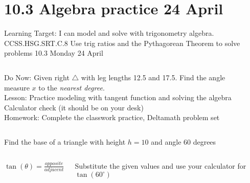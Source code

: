 \documentclass[onlytextwidth, aspectratio=169]{beamer}
\begin{document}
\section{10.3 Algebra practice \hfill 24 April \,}
\begin{frame}{Learning Target: I can model and solve with trigonometry algebra.}
  {CCSS.HSG.SRT.C.8 Use trig ratios and the Pythagorean Theorem to solve problems \hfill \alert{10.3 Monday 24 April}}
  \begin{columns}
    Do Now: Given right $\triangle$ with leg lengths 12.5 and 17.5. Find the angle measure $x$ to the \emph{nearest degree}. \\[0.5cm]
    Lesson: Practice modeling with tangent function and solving the algebra \\
      \alert{Calculator check} (it should be on your desk) \\[0.5cm]
    Homework: Complete the classwork practice, Deltamath problem set
    \begin{flushright}
    \end{flushright}
  \end{columns}
\end{frame}

\begin{frame}{Find the base of a triangle with height $h=10$ and angle 60 degrees}
  \begin{columns}
    \begin{center}
      $\displaystyle \tan(\theta)=\frac{opposite}{adjacent}$
      \end{center}
      Substitute the given values and use your calculator for $\tan(60^\circ)$
    \begin{flushright}
    \end{flushright}
  \end{columns}
\end{frame}
\end{document}
